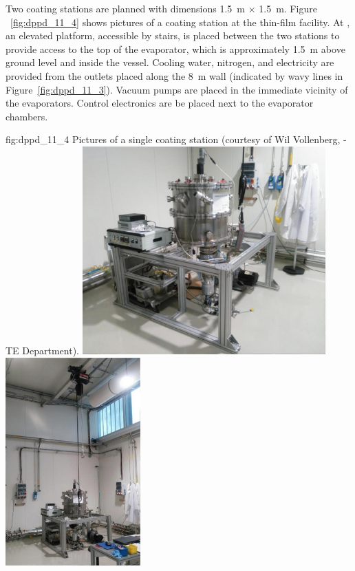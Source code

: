 Two coating stations are planned with dimensions \SI{1.5}{\m} $\times$ \SI{1.5}{\m}. Figure ~\ref{fig:dppd_11_4} shows pictures of a  coating station at the  thin-film facility. At , an elevated platform, accessible by stairs, is placed between the two stations %
to provide access to the top of the evaporator, which is approximately \SI{1.5}{\m} above ground level and inside the vessel. Cooling water, nitrogen, and electricity are provided from the outlets placed along the \SI{8}{\m} wall (indicated by wavy lines in Figure~\ref{fig:dppd_11_3}). Vacuum pumps are placed in the immediate vicinity of the evaporators. Control electronics are be placed next to the evaporator chambers. 

\begin{dunefigure}{fig:dppd_11_4}
{Pictures of a single  coating station (courtesy of Wil Vollenberg, -TE Department).}
\includegraphics[height=8cm]{graphics/dppd_11_4_left.jpg}
\includegraphics[height=8cm]{graphics/dppd_11_4_right.jpg}
\end{dunefigure}



